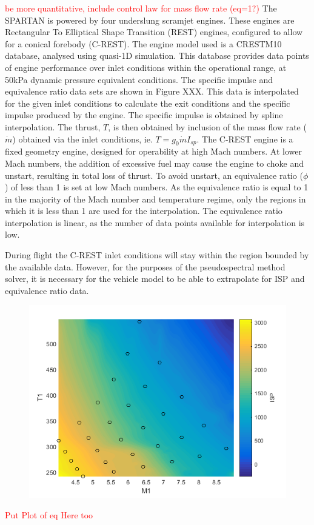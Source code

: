 		\textcolor{red}{be more quantitative, include control law for mass flow rate (eq=1?)}
		The SPARTAN is powered by four underslung scramjet engines. These engines are Rectangular To Elliptical Shape Transition (REST) engines, configured to allow for a conical forebody (C-REST). The engine model used is a CRESTM10 database\cite{Preller2017}, analysed using quasi-1D simulation.
	This database provides data points of engine performance over inlet conditions within the operational range, at 50kPa dynamic pressure equivalent conditions. The specific impulse and equivalence ratio data sets are shown in Figure XXX. This data is interpolated for the given inlet conditions to calculate the exit conditions and the specific impulse produced by the engine. The specific impulse is obtained by spline interpolation. The thrust, $T$, is then obtained by inclusion of the mass flow rate ($\dot{m}$) obtained via the inlet conditions, ie. $T = g_0\dot{m}I_{sp}$.
	The C-REST engine is a fixed geometry engine, designed for operability at high Mach numbers\cite{Preller2017}. At lower Mach numbers, the addition of excessive fuel may cause the engine to choke and unstart, resulting in total loss of thrust\cite{Preller2017}. To avoid unstart, an equivalence ratio ($\phi$) of less than 1 is set at low Mach numbers. As the equivalence ratio is equal to 1 in the majority of the Mach number and temperature regime, only the regions in which it is less than 1 are used for the interpolation. The equivalence ratio interpolation is linear, as the number of data points available for interpolation is low. 
	
	During flight the C-REST inlet conditions will stay within the region bounded by the available data. However, for the purposes of the pseudospectral method solver, it is necessary for the vehicle model to be able to extrapolate for ISP and equivalence ratio data. 
	
	\begin{figure}
\centering
\includegraphics[width=0.7\linewidth]{figures/3_vehicle_design/ISPinterp}
\caption{}
\label{fig:ISPinterp}
\end{figure}
	\textcolor{red}{Put Plot of eq Here too}

